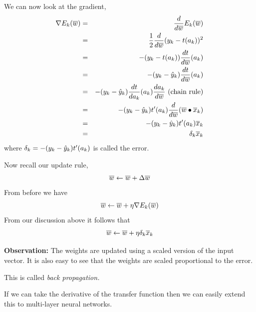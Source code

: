 \documentclass[a4paper,blends,pdf,colorBG,slideColor]{prosper}
\begin{document}
We can now look at the gradient,
\begin{eqnarray*}
\nabla E_k(\overline{w}) &=& \frac{d}{d\overline{w}} E_k(\overline{w}) \\
	&=& \frac{1}{2} \frac{d}{d\overline{w}}(y_k-t(a_k))^2\\
	&=& -(y_k -t(a_k))\frac{dt}{d\overline{w}}(a_k)\\
	&=& -(y_k -\hat{y}_k)\frac{dt}{d\overline{w}}(a_k)\\
	&=& -(y_k -\hat{y}_k)\frac{dt}{da_k} (a_k) \frac{da_k}{d\overline{w}} \mbox{ (chain rule)}\\
	&=& -(y_k -\hat{y}_k)t'(a_k) \frac{d}{d\overline{w}}(\overline{w}\bullet\overline{x}_k) \\
	&=& -(y_k -\hat{y}_k)t'(a_k) \overline{x}_k \\
	&=& \delta_k \overline{x}_k
\end{eqnarray*}
where $\delta_k = -(y_k -\hat{y}_k)t'(a_k)$ is called the error.
\es


Now recall our update rule,
\[
\overline{w} \leftarrow \overline{w} + \Delta \overline{w}
\]
From before we have
\[
\overline{w} \leftarrow \overline{w} + \eta \nabla E_k(\overline{w})
\]
From our discussion above it follows that
\[
\overline{w} \leftarrow \overline{w} + \eta \delta_k\overline{x}_k
\]

\vspace{.2in}
{\bf Observation:} The weights are updated using a scaled version of the input vector.  It is also easy to see that the weights are scaled 
proportional to the error.

This is called {\em back propagation.}

If we can take the derivative of the transfer function then we can easily extend this to multi-layer neural networks.
\es
\end{document}
